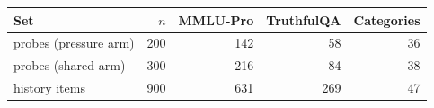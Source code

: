\begin{tabular}{lrrrr}
\toprule
Set & $n$ & MMLU-Pro & TruthfulQA & Categories \\
\midrule
probes (pressure arm) & 200 & 142 & 58 & 36 \\
probes (shared arm) & 300 & 216 & 84 & 38 \\
history items & 900 & 631 & 269 & 47 \\
\bottomrule
\end{tabular}
